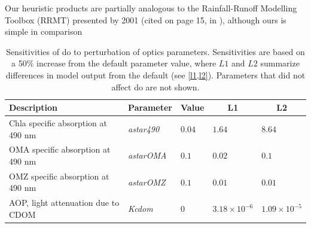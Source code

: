 \documentclass[letterpaper,12pt,oneside]{article}\usepackage[]{graphicx}\usepackage[]{color}
\begin{document}
Our heuristic products are partially analogous to the Rainfall-Runoff Modelling Toolbox (RRMT) presented by \citep{Wagener01b}2001 (cited on page 15, in \citealt{Wagener01}), although ours is simple in comparison

\clearpage
\begin{singlespace}


\end{singlespace}
\clearpage


\begin{table}[!tbp]
{\normalsize
\caption{Sensitivities of \ac{do} to perturbation of optics parameters.  Sensitivities are based on a 50\% increase from the default parameter value, where $L1$ and $L2$ summarize differences in model output from the default (see \cref{l1,l2}).  Parameters that did not affect \ac{do} are not shown.\label{tab:optsens}} 
\begin{center}
\begin{tabular}{lllll}
\hline\hline
\multicolumn{1}{l}{Description}&\multicolumn{1}{c}{Parameter}&\multicolumn{1}{c}{Value}&\multicolumn{1}{c}{L1}&\multicolumn{1}{c}{L2}\tabularnewline
\hline
Chla specific absorption at 490 nm&\textit{astar490}&$0.04$&$1.64$&$8.64$\tabularnewline
OMA specific absorption at 490 nm&\textit{astarOMA}&$0.1$&$0.02$&$0.1$\tabularnewline
OMZ specific absorption at 490 nm&\textit{astarOMZ}&$0.1$&$0.01$&$0.01$\tabularnewline
AOP, light attenuation due to CDOM&\textit{Kcdom}&$0$&$3.18\times 10^{-6}$&$1.09\times 10^{-5}$\tabularnewline
\hline
\end{tabular}\end{center}}

\end{table}
\end{document}
